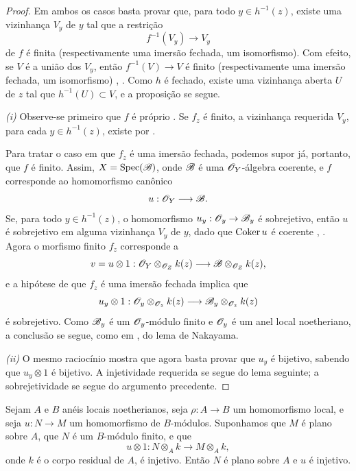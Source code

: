\begin{proof}
Em ambos os casos basta provar que, para todo
$y\in h^{-1}(z)$, existe uma vizinhança $V_y$ de $y$ tal que
a restrição
\[
  f^{-1}(V_y)\longrightarrow V_y
\]
de $f$ é finita (respectivamente uma imersão fechada, um isomorfismo).
Com efeito, se $V$ é a união dos $V_y$, então
$f^{-1}(V)\to V$ é finito (respectivamente uma imersão fechada, um
isomorfismo) , . Como $h$ é
fechado, existe uma vizinhança aberta $U$ de $z$ tal que
$h^{-1}(U)\subset V$, e a proposição se segue.

\noindent\textit{(i)} Observe-se primeiro que $f$ é próprio
. Se
$f_z$ é finito, a vizinhança requerida $V_y$, para cada
$y\in h^{-1}(z)$, existe por .


Para tratar o caso em que $f_z$ é uma imersão fechada, podemos
supor já, portanto, que $f$ é finito. Assim,
$X=\operatorname{Spec}(\mathscr{B})$, onde $\mathscr{B}$ é uma
$\mathscr{O}_Y$-álgebra coerente, e $f$ corresponde  ao
homomorfismo canônico
\[
  u:\mathscr{O}_Y\longrightarrow\mathscr{B}.
\]
Se, para todo $y\in h^{-1}(z)$, o homomorfismo
$u_y:\sh{O}_y\to\sh{B}_y$ é sobrejetivo, então $u$ é sobrejetivo em
alguma vizinhança $V_y$ de $y$, dado que $\operatorname{Coker} u$ é coerente
, . Agora o morfismo finito
$f_z$ corresponde a
\[
  v=u\otimes1:
  \mathscr{O}_Y\otimes_{\mathscr{O}_Z}k(z)
  \longrightarrow
  \mathscr{B}\otimes_{\mathscr{O}_Z}k(z),
\]
e a hipótese de que $f_z$ é uma imersão fechada implica que
\[
  u_y\otimes1:
  \mathscr{O}_y\otimes_{\mathscr{O}_z}k(z)
  \longrightarrow
  \mathscr{B}_y\otimes_{\mathscr{O}_z}k(z)
\]
é sobrejetivo. Como $\mathscr{B}_y$ é um $\mathscr{O}_y$-módulo finito e
$\mathscr{O}_y$ é um anel local noetheriano, a conclusão se segue, como
em , do lema de Nakayama.

\noindent\textit{(ii)} O mesmo raciocínio mostra que agora
basta provar
que $u_y$ é bijetivo, sabendo que $u_y\otimes1$ é bijetivo.
A injetividade requerida se segue do lema seguinte; a sobrejetividade
se segue do argumento precedente.
\end{proof}

\begin{lemma}[4.6.7.1]
\label{III.4.6.7.1}
Sejam $A$ e $B$ anéis locais noetherianos, seja
$\rho:A\to B$ um homomorfismo local, e seja $u:N\to M$ um
homomorfismo de $B$-módulos. Suponhamos que $M$ é plano sobre $A$,
que $N$ é um $B$-módulo finito, e que
\[
  u\otimes1:
  N\otimes_A k\longrightarrow M\otimes_A k,
\]
onde $k$ é o corpo residual de $A$, é injetivo. Então $N$ é
plano sobre $A$ e $u$ é injetivo.
\end{lemma}

